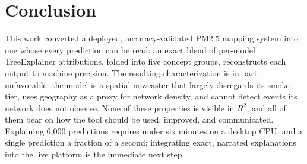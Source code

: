 \documentclass[conference]{IEEEtran}
\begin{document}
\balance
\section{Conclusion}
This work converted a deployed, accuracy-validated PM2.5 mapping system
into one whose every prediction can be read: an exact blend of per-model
TreeExplainer attributions, folded into five concept groups, reconstructs
each output to machine precision. The resulting characterization is in
part unfavorable: the model is a spatial nowcaster that largely
disregards its smoke tier, uses geography as a proxy for network density,
and cannot detect events its network does not observe. None of these
properties is visible in $R^2$, and all of them bear on how the tool
should be used, improved, and communicated. Explaining 6,000 predictions
requires under six minutes on a desktop CPU, and a single prediction a
fraction of a second; integrating exact, narrated explanations into the
live platform is the immediate next step.



\end{document}
